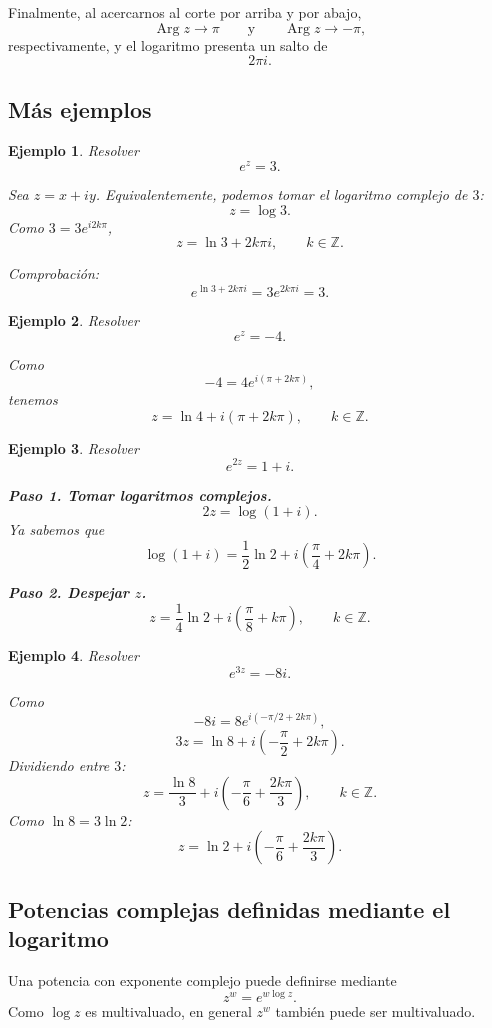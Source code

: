 \documentclass[12pt]{article}
\newtheorem{Ejem}{Ejemplo}
\DeclareMathOperator{\Arg}{Arg}
\begin{document}
Finalmente, al acercarnos al corte por arriba y por abajo,
\[
\Arg z\to\pi
\qquad\text{y}\qquad
\Arg z\to-\pi,
\]
respectivamente, y el logaritmo presenta un salto de
\[
\boxed{2\pi i.}
\]

\subsection*{M\'as ejemplos}
\begin{Ejem}
Resolver
\[
e^z=3.
\]

Sea $z=x+iy$. Equivalentemente, podemos tomar el logaritmo complejo de $3$:
\[
z=\log3.
\]
Como $3=3e^{i2k\pi}$,
\[
\boxed{
z=\ln3+2k\pi i,\qquad k\in\mathbb Z.
}
\]

Comprobación:
\[
e^{\ln3+2k\pi i}
=3e^{2k\pi i}=3.
\]
\end{Ejem}

\begin{Ejem}
Resolver
\[
e^z=-4.
\]

Como
\[
-4=4e^{i(\pi+2k\pi)},
\]
tenemos
\[
\boxed{
z=\ln4+i(\pi+2k\pi),\qquad k\in\mathbb Z.
}
\]
\end{Ejem}

\begin{Ejem}
Resolver
\[
e^{2z}=1+i.
\]

\textbf{Paso 1. Tomar logaritmos complejos.}
\[
2z=\log(1+i).
\]
Ya sabemos que
\[
\log(1+i)
=
\frac12\ln2
+i\left(\frac{\pi}{4}+2k\pi\right).
\]

\textbf{Paso 2. Despejar $z$.}
\[
\boxed{
z=
\frac14\ln2
+i\left(\frac{\pi}{8}+k\pi\right),
\qquad k\in\mathbb Z.
}
\]
\end{Ejem}

\begin{Ejem}
Resolver
\[
e^{3z}=-8i.
\]

Como
\[
-8i=8e^{i(-\pi/2+2k\pi)},
\]
\[
3z=\ln8+i\left(-\frac{\pi}{2}+2k\pi\right).
\]
Dividiendo entre $3$:
\[
\boxed{
z=\frac{\ln8}{3}
+i\left(-\frac{\pi}{6}+\frac{2k\pi}{3}\right),
\qquad k\in\mathbb Z.
}
\]
Como $\ln8=3\ln2$:
\[
\boxed{
z=\ln2+i\left(-\frac{\pi}{6}+\frac{2k\pi}{3}\right).
}
\]
\end{Ejem}
\subsection*{Potencias complejas definidas mediante el logaritmo}
Una potencia con exponente complejo puede definirse mediante
\[
\boxed{
z^w=e^{w\log z}.
}
\]
Como $\log z$ es multivaluado, en general $z^w$ también puede ser
multivaluado.
\end{document}
